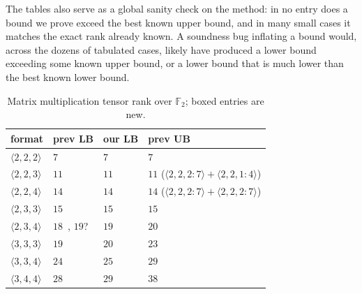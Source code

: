 \documentclass[11pt]{article}
\theoremstyle{definition}
\newcommand{\F}{\mathbb{F}}
\newcommand{\mmt}[3]{\langle #1,#2,#3\rangle}
\begin{document}
The tables also serve as a global sanity check on the method: in no entry does a
bound we prove exceed the best known upper bound, and in many small cases it matches
the exact rank already known. A soundness bug inflating a bound would, across the
dozens of tabulated cases, likely have produced a lower bound exceeding some known
upper bound, or a lower bound that is much lower than the best known lower bound.

\begin{table}[!ht]
  \centering
  \setlength{\tabcolsep}{14pt}
  \begin{tabular}{llll}
    \toprule
    format          & prev LB                                                          & our LB       & prev UB                                                      \\
    \midrule
    $\mmt{2}{2}{2}$ & $7$~\cite{winograd1971multiplication}                            & $7$          & $7$~\cite{strassen1969gaussian}                              \\
    $\mmt{2}{2}{3}$ & $11$~\cite{hopcroft1971minimizing}                               & $11$         & $11$ ($\langle 2, 2, 2:7\rangle + \langle 2, 2, 1:4\rangle$) \\
    $\mmt{2}{2}{4}$ & $14$~\cite{hopcroft1971minimizing}                               & $14$         & $14$ ($\langle 2, 2, 2:7\rangle + \langle 2, 2, 2:7\rangle$) \\
    $\mmt{2}{3}{3}$ & $15$~\cite{hopcroft1971minimizing}                               & $15$         & $15$~\cite{hopcroft1971minimizing}                           \\
    $\mmt{2}{3}{4}$ & $18$~\cite{blaser1999lower}, $19$?~\cite{hopcroft1971minimizing} & $\boxed{19}$ & $20$~\cite{hopcroft1971minimizing}                           \\
    $\mmt{3}{3}{3}$ & $19$~\cite{blaser2003complexity}                                 & $\boxed{20}$ & $23$~\cite{laderman1976noncommutative}                       \\
    $\mmt{3}{3}{4}$ & $24$~\cite{blaser2003complexity}                                 & $\boxed{25}$ & $29$~\cite{smirnov2013bilinear}                              \\
    $\mmt{3}{4}{4}$ & $28$~\cite{blaser1999lower}                                      & $\boxed{29}$ & $38$~\cite{smirnov2013bilinear}                              \\
    \bottomrule
  \end{tabular}
  \caption{Matrix multiplication tensor rank over $\F_2$; boxed entries are new.}
  \label{tab:matrix}
\end{table}
\end{document}

